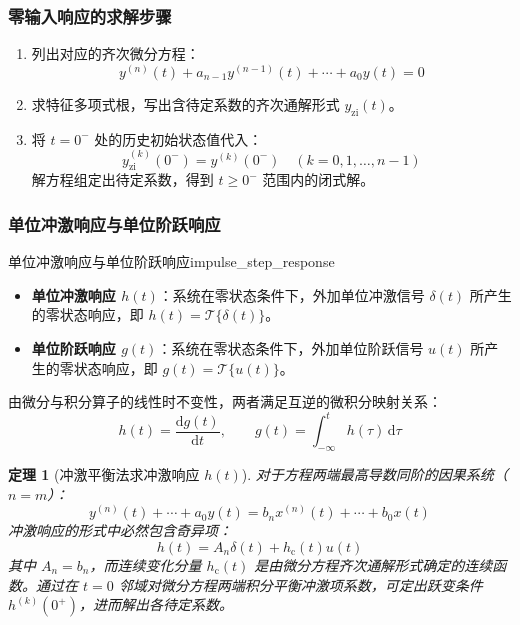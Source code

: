\documentclass[11pt,a4paper,fontset=fandol]{ctexart}
\newtheorem{theorem}{定理}[section]
\theoremstyle{remark}
\begin{document}
\subsubsection{零输入响应的求解步骤}
\begin{enumerate}
    \item 列出对应的齐次微分方程：
    \begin{equation}
        y^{(n)}(t) + a_{n-1}y^{(n-1)}(t) + \cdots + a_0 y(t) = 0
    \end{equation}
    \item 求特征多项式根，写出含待定系数的齐次通解形式 $y_{\mathrm{zi}}(t)$。
    \item 将 $t = 0^-$ 处的历史初始状态值代入：
    \begin{equation}
        y_{\mathrm{zi}}^{(k)}(0^-) = y^{(k)}(0^-) \quad (k = 0, 1, \dots, n-1)
    \end{equation}
    解方程组定出待定系数，得到 $t \ge 0^-$ 范围内的闭式解。
\end{enumerate}

\subsubsection{单位冲激响应与单位阶跃响应}
\begin{definition}{单位冲激响应与单位阶跃响应}{impulse_step_response}
\begin{itemize}
    \item \textbf{单位冲激响应 $h(t)$}：系统在零状态条件下，外加单位冲激信号 $\delta(t)$ 所产生的零状态响应，即 $h(t) = \mathcal{T}\{\delta(t)\}$。
    \item \textbf{单位阶跃响应 $g(t)$}：系统在零状态条件下，外加单位阶跃信号 $u(t)$ 所产生的零状态响应，即 $g(t) = \mathcal{T}\{u(t)\}$。
\end{itemize}
由微分与积分算子的线性时不变性，两者满足互逆的微积分映射关系：
\begin{equation}
    h(t) = \frac{\mathrm{d}g(t)}{\mathrm{d}t}, \qquad g(t) = \int_{-\infty}^t h(\tau)\,\mathrm{d}\tau
\end{equation}
\end{definition}

\begin{theorem}[冲激平衡法求冲激响应 $h(t)$]
对于方程两端最高导数同阶的因果系统（$n = m$）：
\begin{equation}
    y^{(n)}(t) + \cdots + a_0 y(t) = b_n x^{(n)}(t) + \cdots + b_0 x(t)
\end{equation}
冲激响应的形式中必然包含奇异项：
\begin{equation}
    h(t) = A_n \delta(t) + h_{\mathrm{c}}(t)u(t)
\end{equation}
其中 $A_n = b_n$，而连续变化分量 $h_{\mathrm{c}}(t)$ 是由微分方程齐次通解形式确定的连续函数。通过在 $t = 0$ 邻域对微分方程两端积分平衡冲激项系数，可定出跃变条件 $h^{(k)}(0^+)$，进而解出各待定系数。
\end{theorem}
\end{document}

